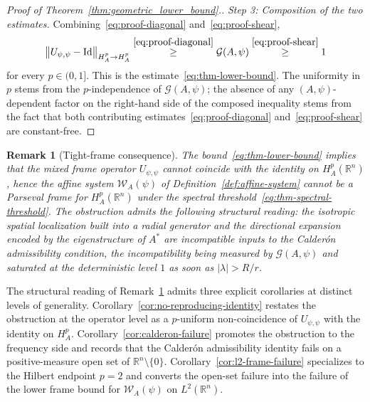 \documentclass[pdflatex,sn-basic,Numbered]{sn-jnl}
\theoremstyle{thmstyleone}%
\theoremstyle{thmstylethree}%
\newtheorem{remark}{Remark}%
\begin{document}
\begin{proof}[Proof of Theorem~\ref{thm:geometric_lower_bound}.]
	\medskip
	\emph{Step 3: Composition of the two estimates.}
	Combining~\eqref{eq:proof-diagonal} and~\eqref{eq:proof-shear},
	\begin{equation*}
		\bigl\| U_{\psi,\psi} - \mathrm{Id} \bigr\|_{H^p_A \to H^p_A}
		 \overset{\eqref{eq:proof-diagonal}}{\ge} 
		\mathcal{G}(A, \psi)
		 \overset{\eqref{eq:proof-shear}}{\ge} 
		1
	\end{equation*}
	for every $p \in (0, 1]$. This is the
	estimate~\eqref{eq:thm-lower-bound}. The uniformity in $p$ stems from the
	$p$-independence of $\mathcal{G}(A, \psi)$; the absence of any
	$(A, \psi)$-dependent factor on the right-hand side of the composed
	inequality stems from the fact that both contributing
	estimates~\eqref{eq:proof-diagonal} and~\eqref{eq:proof-shear} are
	constant-free.
\end{proof}

\begin{remark}[Tight-frame consequence]\label{rem:no-tight-frame}
	The bound~\eqref{eq:thm-lower-bound} implies that the mixed frame operator
	$U_{\psi,\psi}$ cannot coincide with the identity on $H^p_A(\mathbb{R}^n)$,
	hence the affine system $\mathcal{W}_A(\psi)$ of
	Definition~\ref{def:affine-system} cannot be a Parseval frame for
	$H^p_A(\mathbb{R}^n)$ under the spectral
	threshold~\eqref{eq:thm-spectral-threshold}. The obstruction admits the
	following structural reading: the isotropic spatial localization built
	into a radial generator and the directional expansion encoded by the
	eigenstructure of $A^{*}$ are incompatible inputs to the Calder\'on
	admissibility condition, the incompatibility being measured by
	$\mathcal{G}(A, \psi)$ and saturated at the deterministic level $1$ as
	soon as $|\lambda| > R/r$.
\end{remark}

The structural reading of Remark~\ref{rem:no-tight-frame} admits
three explicit corollaries at distinct levels of generality.
Corollary~\ref{cor:no-reproducing-identity} restates the obstruction
at the operator level as a $p$-uniform non-coincidence of
$U_{\psi,\psi}$ with the identity on $H^p_A$.
Corollary~\ref{cor:calderon-failure} promotes the obstruction to
the frequency side and records that the Calder\'on admissibility
identity fails on a positive-measure open set of
$\mathbb{R}^n \setminus \{0\}$.
Corollary~\ref{cor:l2-frame-failure} specializes to the Hilbert
endpoint $p = 2$ and converts the open-set failure into the failure
of the lower frame bound for $\mathcal{W}_A(\psi)$ on
$L^2(\mathbb{R}^n)$.
\end{document}
